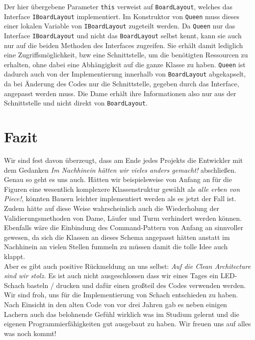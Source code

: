 \documentclass[
10pt, %
a4paper, %
oneside, %
headinclude,footinclude, %
BCOR5mm, %
]{scrartcl}
\begin{document}
\begin{onehalfspace}
Der hier übergebene Parameter \texttt{this} verweist auf \texttt{BoardLayout}, welches das Interface \texttt{IBoardLayout} implementiert. Im Konstruktor von \texttt{Queen} muss dieses einer lokalen Variable von \texttt{IBoardLayout} zugeteilt werden. Da \texttt{Queen} nur das Interface \texttt{IBoardLayout}
und nicht das \texttt{BoardLayout} selbst kennt, kann sie auch nur auf die beiden Methoden des Interfaces zugreifen. Sie erhält damit lediglich eine Zugriffsmöglichkeit, bzw eine Schnittstelle, um die benötigten Ressourcen zu erhalten, ohne dabei eine Abhängigkeit auf die ganze Klasse zu haben. \texttt{Queen} ist dadurch auch von der Implementierung innerhalb von \texttt{BoardLayout} abgekapselt, da bei Änderung des Codes nur die Schnittstelle, gegeben durch das Interface, angepasst werden muss. Die Dame erhält ihre Informationen also nur aus der Schnittstelle und nicht direkt von \texttt{BoardLayout}.
\newpage
\section{Fazit}
\label{sec:end}

Wir sind fest davon überzeugt, dass am Ende jedes Projekts die Entwickler mit dem Gedanken \textit{Im Nachhinein hätten wir vieles anders gemacht!} abschließen. Genau so geht es uns auch. Hätten wir beispielsweise von Anfang an für die Figuren eine wesentlich komplexere Klassenstruktur gewählt als \textit{alle erben von Piece!}, könnten Bauern leichter implementiert werden als es jetzt der Fall ist. Zudem hätte auf diese Weise wahrscheinlich auch die Wiederholung der Validierungsmethoden von Dame, Läufer und Turm verhindert werden können. \\
Ebenfalls wäre die Einbindung des Command-Pattern von Anfang an sinnvoller gewesen, da sich die Klassen an dieses Schema angepasst hätten anstatt im Nachhinein an vielen Stellen fummeln zu müssen damit die tolle Idee auch klappt. \\
Aber es gibt auch positive Rückmeldung an uns selbst: \textit{Auf die Clean Architecture sind wir stolz.} Es ist auch nicht ausgeschlossen dass wir eines Tages ein LED-Schach basteln / drucken und dafür einen großteil des Codes verwenden werden.\\
Wir sind froh, uns für die Implementierung von Schach entschieden zu haben. Nach Einsicht in den alten Code von vor drei Jahren gab es neben einigen Lachern auch das belohnende Gefühl wirklich was im Studium gelernt und die eigenen Programmierfähigkeiten gut ausgebaut zu haben. Wir freuen uns auf alles was noch kommt!


\end{onehalfspace}
\end{document}

